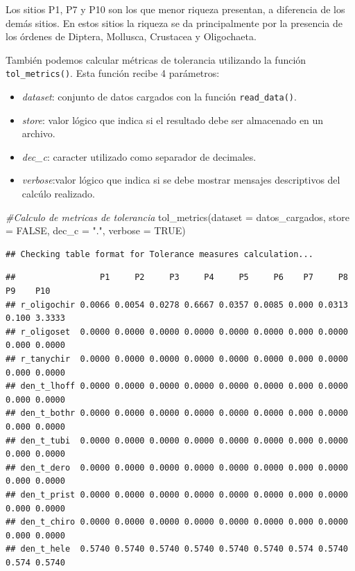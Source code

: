 \documentclass[
]{book}
\newenvironment{Shaded}{\begin{snugshade}}{\end{snugshade}}
\newcommand{\AttributeTok}[1]{\textcolor[rgb]{0.77,0.63,0.00}{#1}}
\newcommand{\CommentTok}[1]{\textcolor[rgb]{0.56,0.35,0.01}{\textit{#1}}}
\newcommand{\ConstantTok}[1]{\textcolor[rgb]{0.00,0.00,0.00}{#1}}
\newcommand{\FunctionTok}[1]{\textcolor[rgb]{0.00,0.00,0.00}{#1}}
\newcommand{\NormalTok}[1]{#1}
\newcommand{\StringTok}[1]{\textcolor[rgb]{0.31,0.60,0.02}{#1}}
\providecommand{\tightlist}{%
  \setlength{\itemsep}{0pt}\setlength{\parskip}{0pt}}
\begin{document}
Los sitios P1, P7 y P10 son los que menor riqueza presentan, a diferencia de los demás sitios.
En estos sitios la riqueza se da principalmente por la presencia de los órdenes de Diptera, Mollusca, Crustacea y Oligochaeta.

También podemos calcular métricas de tolerancia utilizando la función \texttt{tol\_metrics()}.
Esta función recibe 4 parámetros:

\begin{itemize}
\tightlist
\item
  \emph{dataset}: conjunto de datos cargados con la función \texttt{read\_data()}.
\item
  \emph{store}: valor lógico que indica si el resultado debe ser almacenado en un archivo.
\item
  \emph{dec\_c}: caracter utilizado como separador de decimales.
\item
  \emph{verbose}:valor lógico que indica si se debe mostrar mensajes descriptivos del calcúlo realizado.
\end{itemize}

\begin{Shaded}
\begin{Highlighting}[]
\CommentTok{\#Calculo de metricas de tolerancia}
\FunctionTok{tol\_metrics}\NormalTok{(}\AttributeTok{dataset =}\NormalTok{ datos\_cargados, }\AttributeTok{store =} \ConstantTok{FALSE}\NormalTok{, }\AttributeTok{dec\_c =} \StringTok{"."}\NormalTok{, }\AttributeTok{verbose =} \ConstantTok{TRUE}\NormalTok{)}
\end{Highlighting}
\end{Shaded}

\begin{verbatim}
## Checking table format for Tolerance measures calculation...
\end{verbatim}

\begin{verbatim}
##                 P1     P2     P3     P4     P5     P6    P7     P8    P9    P10
## r_oligochir 0.0066 0.0054 0.0278 0.6667 0.0357 0.0085 0.000 0.0313 0.100 3.3333
## r_oligoset  0.0000 0.0000 0.0000 0.0000 0.0000 0.0000 0.000 0.0000 0.000 0.0000
## r_tanychir  0.0000 0.0000 0.0000 0.0000 0.0000 0.0000 0.000 0.0000 0.000 0.0000
## den_t_lhoff 0.0000 0.0000 0.0000 0.0000 0.0000 0.0000 0.000 0.0000 0.000 0.0000
## den_t_bothr 0.0000 0.0000 0.0000 0.0000 0.0000 0.0000 0.000 0.0000 0.000 0.0000
## den_t_tubi  0.0000 0.0000 0.0000 0.0000 0.0000 0.0000 0.000 0.0000 0.000 0.0000
## den_t_dero  0.0000 0.0000 0.0000 0.0000 0.0000 0.0000 0.000 0.0000 0.000 0.0000
## den_t_prist 0.0000 0.0000 0.0000 0.0000 0.0000 0.0000 0.000 0.0000 0.000 0.0000
## den_t_chiro 0.0000 0.0000 0.0000 0.0000 0.0000 0.0000 0.000 0.0000 0.000 0.0000
## den_t_hele  0.5740 0.5740 0.5740 0.5740 0.5740 0.5740 0.574 0.5740 0.574 0.5740
\end{verbatim}
\end{document}
